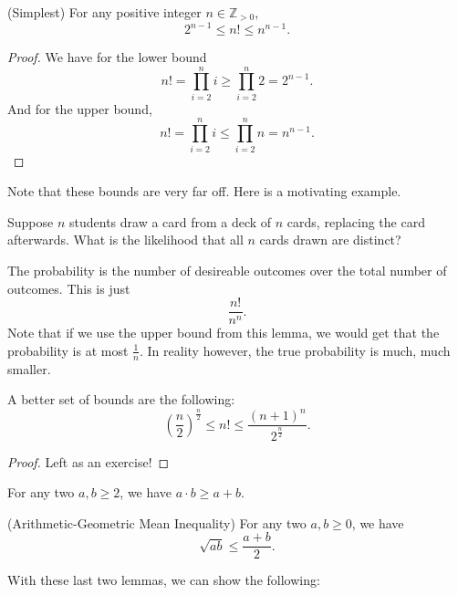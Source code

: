 
\begin{lemma}
	(Simplest) For any positive integer \( n \in \mathbb{Z}_{>0} \), \[
		2^{n-1} \le n! \le n^{n-1}  
	.\] 
\end{lemma}
\begin{proof}
	We have for the lower bound
	\[
		n! = \prod_{i=2}^{n}i \ge \prod_{i=2}^{n}2 = 2^{n-1}  
	.\] 
	And for the upper bound,
	\[
		n! = \prod_{i=2}^{n}i \le \prod_{i=2}^{n}n = n^{n-1}  
	.\] 
\end{proof}

Note that these bounds are very far off. Here is a motivating example.

\begin{eg}
	Suppose \( n \) students draw a card from a deck of \( n \) cards, replacing the card afterwards. What is the likelihood that all \( n \) cards drawn are distinct?
\end{eg}
\begin{explanation}
	The probability is the number of desireable outcomes over the total number of outcomes. This is just \[
		\frac{n!}{n^{n} }
	.\] 
	Note that if we use the upper bound from this lemma, we would get that the probability is at most \( \frac{1}{n} \). In reality however, the true probability is much, much smaller.
\end{explanation}

\begin{lemma}
	A better set of bounds are the following:
	\[
		\left( \frac{n}{2} \right) ^{\frac{n}{2}} \le n! \le \frac{(n+1)^{n} }{2^{\frac{n}{2}} }
	.\] 
\end{lemma}
\begin{proof}
	Left as an exercise!
\end{proof}

\begin{lemma}
	For any two \( a,b \ge 2 \), we have \( a\cdot b\ge a+b \).
\end{lemma}
\begin{lemma}
	(Arithmetic-Geometric Mean Inequality) For any two \( a,b\ge 0 \), we have \[
		\sqrt{ab} \le \frac{a+b}{2}
	.\] 
\end{lemma}

With these last two lemmas, we can show the following:

